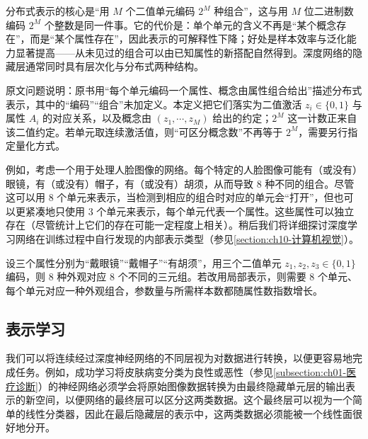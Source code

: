 \documentclass[../../main.tex]{subfiles}
\begin{document}
\begin{remark}分布式表示的核心是“用 $M$ 个二值单元编码 $2^{M}$ 种组合”，这与用 $M$ 位二进制数编码 $2^{M}$ 个整数是同一件事。它的代价是：单个单元的含义不再是“某个概念存在”，而是“某个属性存在”，因此表示的可解释性下降；好处是样本效率与泛化能力显著提高——从未见过的组合可以由已知属性的新搭配自然得到。深度网络的隐藏层通常同时具有层次化与分布式两种结构。

原文问题说明：原书用“每个单元编码一个属性、概念由属性组合给出”描述分布式表示，其中的“编码”“组合”未加定义。本定义把它们落实为二值激活 $z_i\in\{0,1\}$ 与属性 $A_i$ 的对应关系，以及概念由 $(z_1,\cdots,z_M)$ 给出的约定；$2^{M}$ 这一计数正来自该二值约定。若单元取连续激活值，则“可区分概念数”不再等于 $2^{M}$，需要另行指定量化方式。
\end{remark}

例如，考虑一个用于处理人脸图像的网络。每个特定的人脸图像可能有（或没有）眼镜，有（或没有）帽子，有（或没有）胡须，从而导致 $8$ 种不同的组合。尽管这可以用 $8$ 个单元来表示，当检测到相应的组合时对应的单元会“打开”，但也可以更紧凑地只使用 $3$ 个单元来表示，每个单元代表一个属性。这些属性可以独立存在（尽管统计上它们的存在可能一定程度上相关）。稍后我们将详细探讨深度学习网络在训练过程中自行发现的内部表示类型（参见\cref{section:ch10-计算机视觉}）。

\begin{example}[ 人脸属性的分布式编码]\label{example:ch06-人脸属性}
设三个属性分别为“戴眼镜”“戴帽子”“有胡须”，用三个二值单元 $z_1,z_2,z_3\in\{0,1\}$ 编码，则 $8$ 种外观对应 $8$ 个不同的三元组。若改用局部表示，则需要 $8$ 个单元、每个单元对应一种外观组合，参数量与所需样本数都随属性数指数增长。
\end{example}

\subsection{表示学习}\label{subsection:ch06-表示学习}

我们可以将连续经过深度神经网络的不同层视为对数据进行转换，以便更容易地完成任务。例如，成功学习将皮肤病变分类为良性或恶性（参见\cref{subsection:ch01-医疗诊断}）的神经网络必须学会将原始图像数据转换为由最终隐藏单元层的输出表示的新空间，以便网络的最终层可以区分这两类数据。这个最终层可以视为一个简单的线性分类器，因此在最后隐藏层的表示中，这两类数据必须能被一个线性面很好地分开。
\end{document}

